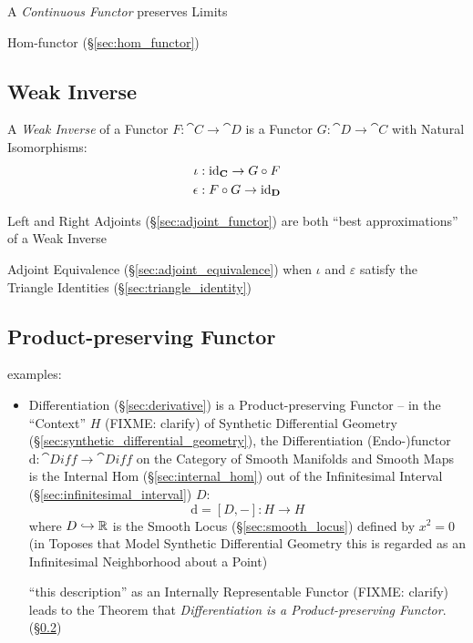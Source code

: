 A \emph{Continuous Functor} preserves Limits

Hom-functor (\S\ref{sec:hom_functor})



\subsection{Weak Inverse}\label{sec:weak_inverse}

A \emph{Weak Inverse} of a Functor $F : \cat{C} \rightarrow \cat{D}$
is a Functor $G : \cat{D} \rightarrow \cat{C}$ with Natural
Isomorphisms:
\begin{align*}
  \iota &: \mathrm{id}_\mathbf{C} \rightarrow G \circ F \\
  \epsilon &: F \circ G \rightarrow \mathrm{id}_\mathbf{D}
\end{align*}

Left and Right Adjoints (\S\ref{sec:adjoint_functor}) are both ``best
approximations'' of a Weak Inverse

Adjoint Equivalence (\S\ref{sec:adjoint_equivalence}) when $\iota$ and
$\varepsilon$ satisfy the Triangle Identities
(\S\ref{sec:triangle_identity})



\subsection{Product-preserving Functor}
\label{sec:product_preserving_functor}

examples:
\begin{itemize}
\item Differentiation (\S\ref{sec:derivative}) is a Product-preserving Functor
  -- in the ``Context'' $H$ (FIXME: clarify) of Synthetic Differential Geometry
  (\S\ref{sec:synthetic_differential_geometry}), the Differentiation
  (Endo-)functor $\mathrm{d} : \cat{Diff} \rightarrow \cat{Diff}$ on the
  Category of Smooth Manifolds and Smooth Maps is the Internal Hom
  (\S\ref{sec:internal_hom}) out of the Infinitesimal Interval
  (\S\ref{sec:infinitesimal_interval}) $D$:
  \[
    \mathrm{d} = [D,-] : H \rightarrow H
  \]
  where $D \hookrightarrow \mathbb{R}$ is the Smooth Locus
  (\S\ref{sec:smooth_locus}) defined by $x^2 = 0$ (in Toposes that Model
  Synthetic Differential Geometry this is regarded as an Infinitesimal
  Neighborhood about a Point)

  ``this description'' as an Internally Representable Functor (FIXME: clarify)
  leads to the Theorem that \emph{Differentiation is a Product-preserving
    Functor}. (\S\ref{sec:product_preserving_functor})
\end{itemize}


